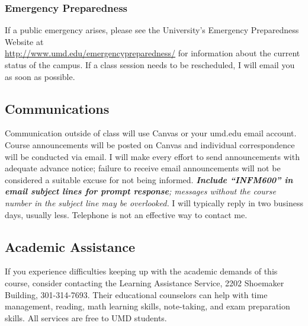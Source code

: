 \documentclass[11pt]{article}
\begin{document}
\subsubsection{Emergency Preparedness}
If a public emergency arises, please see the University's Emergency Preparedness Website at \\ \url{http://www.umd.edu/emergencypreparedness/} for information about the current status of the campus. 
If a class session needs to be rescheduled, I will email you as soon as possible.

\subsection{Communications}
Communication outside of class will use Canvas or your umd.edu email account. 
Course announcements will be posted on Canvas and individual correspondence will be conducted via email.
I will make every effort to send announcements with adequate advance notice; failure to receive email announcements will not be considered a suitable excuse for not being informed. 
\textit{\textbf{Include ``INFM600'' in email subject lines for prompt response}; messages without the course number in the subject line may be overlooked.}
I will typically reply in two business days, usually less.
Telephone is not an effective way to contact me.


\subsection{Academic Assistance}
If you experience difficulties keeping up with the academic demands of this course, consider contacting the Learning Assistance Service, 2202 Shoemaker Building, 301-314-7693. 
Their educational counselors can help with time management, reading, math learning skills, note-taking, and exam preparation skills. 
All services are free to UMD students.
\end{document}
